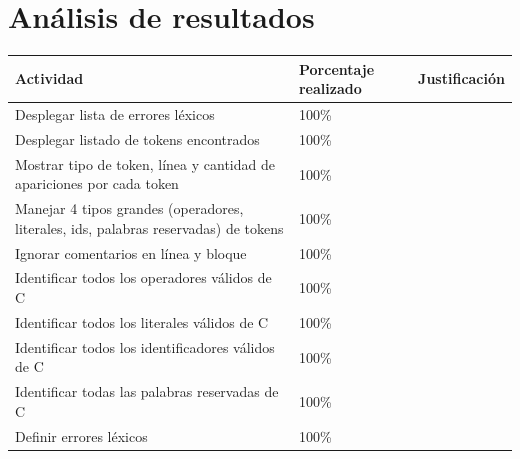 \documentclass[a4paper,12pt]{article}
\begin{document}
\section*{Análisis de resultados}
\begin{table}[!ht]
    \centering
    \begin{tabularx}{\textwidth}{|X|X|X|}
        \hline
        Actividad & Porcentaje realizado & Justificación \\ 
        \hline
        Desplegar lista de errores léxicos & 100\% & \\
        \hline
        Desplegar listado de tokens encontrados & 100\% & \\
        \hline
        Mostrar tipo de token, línea y cantidad de apariciones por cada token & 100\% & \\
        \hline
        Manejar 4 tipos grandes (operadores, literales, ids, palabras reservadas) de tokens & 100\% & \\
        \hline
        Ignorar comentarios en línea y bloque & 100\% & \\
        \hline
        Identificar todos los operadores válidos de C & 100\% & \\
        \hline
        Identificar todos los literales válidos de C & 100\% & \\
        \hline
        Identificar todos los identificadores válidos de C & 100\% & \\
        \hline
        Identificar todas las palabras reservadas de C & 100\% & \\
        \hline
        Definir errores léxicos & 100\% & \\
        \hline
    \end{tabularx}
\end{table}

\end{document}
